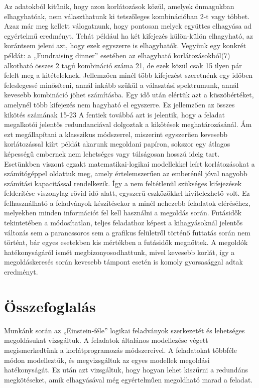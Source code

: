 \documentclass[12pt,a4paper,twoside, openright]{report}
\begin{document}
		Az adatokból kitűnik, hogy azon korlátozások közül, amelyek önmagukban elhagyhatóak, nem választhatunk ki tetszőleges kombinációban 2-t vagy többet. Azaz már meg kellett válogatnunk, hogy pontosan melyek együttes elhagyása ad egyértelmű eredményt. Tehát például ha két kifejezés külön-külön elhagyható, az korántsem jeleni azt, hogy ezek egyszerre is elhagyhatók. Vegyünk egy konkrét példát: a „Fundraising dinner” esetében az elhagyható korlátozásokból(7) alkotható összes 2 tagú kombináció száma 21, de ezek közül csak 15 ilyen pár felelt meg a kitételeknek. Jellemzően minél több kifejezést szeretnénk egy időben feleslegessé minősíteni, annál inkább szűkül a választási spektrumunk, annál kevesebb kombináció jöhet számításba. Egy idő után elértük azt a küszöbértéket, amelynél több kifejezés nem hagyható el egyszerre. Ez jellemzően az összes kikötés számának 15-23%
		A fentiek továbbá azt is jelentik, hogy a feladat megalkotói jelentős redundanciával dolgoztak a kikötések meghatározásánál. Ám ezt megállapítani a klasszikus módszerrel, miszerint egyszerűen kevesebb korlátozással kiírt példát akarunk megoldani papíron, sokszor egy átlagos képességű embernek nem lehetséges vagy túlságosan hosszú ideig tart. Esetünkben viszont egzakt matematikai-logikai modellekkel leírt korlátozásokat a számítógéppel oldattuk meg, amely értelemszerűen az emberénél jóval nagyobb számítási kapacitással rendelkezik. Így a nem feltétlenül szükséges kifejezések felderítése viszonylag rövid idő alatt, egyszerű eszközökkel kivitelezhető volt. Ez felhasználható a feladványok készítésekor a minél nehezebb feladatok eléréséhez, melyekben minden információt fel kell használni a megoldás során.
		Futásidők tekintetében a módosítatlan, teljes feladathoz képest a kihagyásoknál jelentős változás sem a parancssoros sem a grafikus felületről történő futtatás során nem történt, bár egyes esetekben kis mértékben a futásidők megnőttek. A megoldók hatékonyságáról ismét megbizonyosodhattunk, mivel kevesebb korlát, így a megoldáskeresés során kevesebb támpont esetén is komoly gyorsasággal adtak eredményt. 
		
	\chapter{Összefoglalás}
	
		Munkánk során az „Einstein-féle” logikai feladványok szerkezetét és lehetséges megoldásukat vizsgáltuk. A feladatok általános modellezése végett megismerkedtünk a korlátprogramozás módszereivel. A feladatokat többféle módon modelleztük, és megvizsgáltuk az egyes modellek megoldási hatékonyságát. Ez után azt vizsgáltuk, hogy hogyan lehet kiszűrni a redundáns megkötéseket, amik elhagyásával még egyértelműen megoldható marad a feladat.
			
\clearpage
{}

				
				
\end{document}
